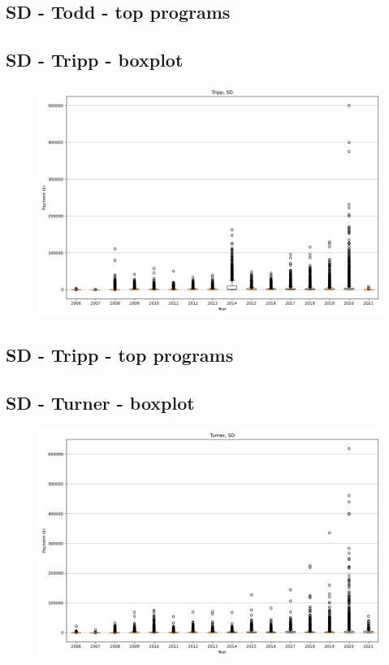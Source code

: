 \subsection*{SD - Todd - top programs}

\newpage
\subsection*{SD - Tripp - boxplot}
\begin{figure}[h]
\centering
\includegraphics[width=7in]{../output/boxplots/counties/Tripp-SD_boxplot.png}
\end{figure}


\subsection*{SD - Tripp - top programs}

\newpage
\subsection*{SD - Turner - boxplot}
\begin{figure}[h]
\centering
\includegraphics[width=7in]{../output/boxplots/counties/Turner-SD_boxplot.png}
\end{figure}


